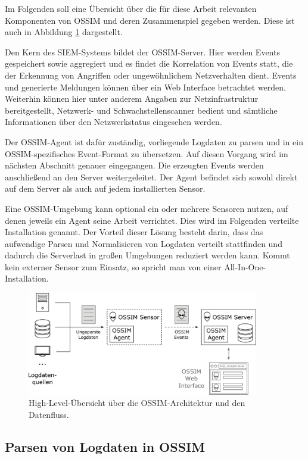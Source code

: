Im Folgenden soll eine Übersicht über die für diese Arbeit relevanten Komponenten von OSSIM und deren Zusammenspiel gegeben werden. Diese ist auch in Abbildung \ref{fig:ossim_log_flow} dargestellt.

Den Kern des SIEM-Systems bildet der OSSIM-Server. Hier werden Events gespeichert sowie aggregiert und es findet die Korrelation von Events statt, die der Erkennung von Angriffen oder ungewöhnlichem Netzverhalten dient. Events und generierte Meldungen können über ein Web Interface betrachtet werden. Weiterhin können hier unter anderem Angaben zur Netzinfrastruktur bereitgestellt, Netzwerk- und Schwachstellenscanner bedient und sämtliche Informationen über den Netzwerkstatus eingesehen werden. 

Der OSSIM-Agent ist dafür zuständig, vorliegende Logdaten zu parsen und in ein OSSIM-spezifisches Event-Format zu übersetzen. Auf diesen Vorgang wird im nächsten Abschnitt genauer eingegangen. Die erzeugten Events werden anschließend an den Server weitergeleitet. Der Agent befindet sich sowohl direkt auf dem Server als auch auf jedem installierten Sensor. 

Eine OSSIM-Umgebung kann optional ein oder mehrere Sensoren nutzen, auf denen jeweils ein Agent seine Arbeit verrichtet. Dies wird im Folgenden verteilte Installation genannt. Der Vorteil dieser Lösung besteht darin, dass das aufwendige Parsen und Normalisieren von Logdaten verteilt stattfinden und dadurch die Serverlast in großen Umgebungen reduziert werden kann. Kommt kein externer Sensor zum Einsatz, so spricht man von einer All-In-One-Installation.

\begin{figure}[]
    \centering
        \includegraphics[width=0.9\textwidth]{dia/ossim_log_flow.pdf}
    \caption{High-Level-Übersicht über die OSSIM-Architektur und den Datenfluss.}
    \label{fig:ossim_log_flow}
\end{figure}


\subsection{Parsen von Logdaten in OSSIM}

